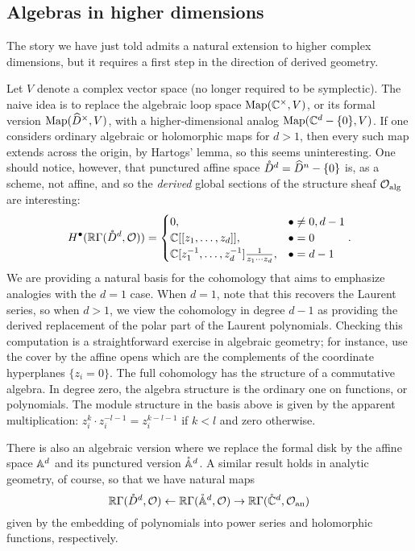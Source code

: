 \documentclass[11pt]{amsart}
\begin{document}
\subsection{Algebras in higher dimensions }

The story we have just told admits a natural extension to higher complex dimensions,
but it requires a first step in the direction of derived geometry.

Let $V$ denote a complex vector space (no longer required to be symplectic).
The naive idea is to replace the algebraic loop space $\Map(\CC^\times,  V)$, or its formal version $\Map(\Hat{D}^\times, V)$, with a higher-dimensional analog $\Map(\CC^d -\{0\}, V)$.
If one considers ordinary algebraic or holomorphic maps for $d > 1$, 
then every such map extends across the origin, by Hartogs' lemma,
so this seems uninteresting.
One should notice, however, that punctured affine space $\mathring{D}^d = \Hat{D}^n -\{0\}$ is, as a scheme, not affine, 
and so the {\em derived} global sections of the structure sheaf $\cO_{\rm alg}$ are interesting:
\[
H^\bu(\RR \Gamma(\mathring{D}^d, \cO)) = \begin{cases} 
0, & \bu \neq 0, d-1 \\ 
\CC[[z_1,\ldots,z_d]], & \bu = 0 \\ 
\CC[z_1^{-1},\ldots,z_d^{-1}] \frac{1}{z_1 \cdots z_d}, & \bu = d-1 
\end{cases} .
\]
We are providing a natural basis for the cohomology 
that aims to emphasize analogies with the $d=1$ case.
When $d=1$, note that this recovers the Laurent series,
so when $d > 1$, 
we view the cohomology in degree $d-1$ as providing the derived replacement of the polar part of the Laurent polynomials.
Checking this computation is a straightforward exercise in algebraic geometry;
for instance, use the cover by the affine opens which are the complements of the coordinate hyperplanes $\{z_i =0\}$.
The full cohomology has the structure of a commutative algebra. 
In degree zero, the algebra structure is the ordinary one on functions, or polynomials.
The module structure in the basis above is given by the apparent multiplication: $z_i^k \cdot z_i^{-l-1} = z_i^{k-l-1}$ if $k < l$ and zero otherwise.

There is also an algebraic version where we replace the formal disk by the affine space $\AA^d$ and its punctured version $\mathring{\AA}^d$.
A similar result holds in analytic geometry, of course,
so that we have natural maps
\[
\RR \Gamma(\mathring{D}^d, \cO) \leftarrow \RR \Gamma(\mathring{\AA}^d, \cO) \to \RR \Gamma(\mathring{\CC}^d, \cO_{\rm an}) 
\]
given by the embedding of polynomials into power series and holomorphic functions, respectively.
\end{document}
